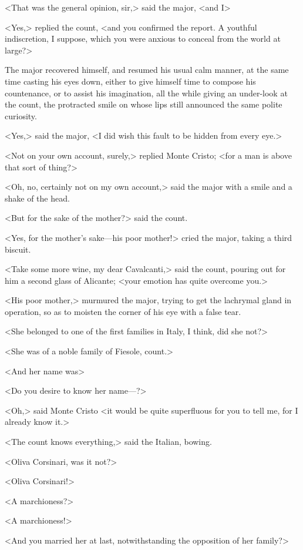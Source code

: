  <That was the general opinion, sir,> said the major, <and I\longdash> 

 <Yes,> replied the count, <and you confirmed the report. A youthful indiscretion, I suppose, which you were anxious to conceal from the world at large?> 

 The major recovered himself, and resumed his usual calm manner, at the same time casting his eyes down, either to give himself time to compose his countenance, or to assist his imagination, all the while giving an under-look at the count, the protracted smile on whose lips still announced the same polite curiosity. 

 <Yes,> said the major, <I did wish this fault to be hidden from every eye.> 

 <Not on your own account, surely,> replied Monte Cristo; <for a man is above that sort of thing?> 

 <Oh, no, certainly not on my own account,> said the major with a smile and a shake of the head. 

 <But for the sake of the mother?> said the count. 

 <Yes, for the mother's sake—his poor mother!> cried the major, taking a third biscuit. 

 <Take some more wine, my dear Cavalcanti,> said the count, pouring out for him a second glass of Alicante; <your emotion has quite overcome you.> 

 <His poor mother,> murmured the major, trying to get the lachrymal gland in operation, so as to moisten the corner of his eye with a false tear. 

 <She belonged to one of the first families in Italy, I think, did she not?> 

 <She was of a noble family of Fiesole, count.> 

 <And her name was\longdash> 

 <Do you desire to know her name—?> 

 <Oh,> said Monte Cristo <it would be quite superfluous for you to tell me, for I already know it.> 

 <The count knows everything,> said the Italian, bowing. 

 <Oliva Corsinari, was it not?> 

 <Oliva Corsinari!> 

 <A marchioness?> 

 <A marchioness!> 

 <And you married her at last, notwithstanding the opposition of her family?> 

